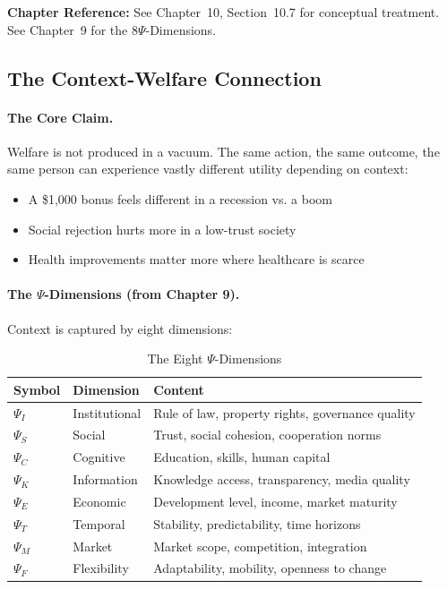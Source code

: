 \begin{cross-reference}
\textbf{Chapter Reference:} See Chapter~10, Section~10.7 for conceptual treatment.
See Chapter~9 for the 8$\Psi$-Dimensions.
\end{cross-reference}

\subsection{The Context-Welfare Connection}

\paragraph{The Core Claim.}
Welfare is not produced in a vacuum. The same action, the same outcome, 
the same person can experience vastly different utility depending on context:

\begin{itemize}
\item A \$1,000 bonus feels different in a recession vs. a boom
\item Social rejection hurts more in a low-trust society
\item Health improvements matter more where healthcare is scarce
\end{itemize}

\paragraph{The $\Psi$-Dimensions (from Chapter 9).}
Context is captured by eight dimensions:

\begin{table}[htbp]
\centering
\caption{The Eight $\Psi$-Dimensions}
\label{tab:app-c-psi-dimensions}
\renewcommand{\arraystretch}{1.3}
\begin{tabular}{@{}lll@{}}
\toprule
\textbf{Symbol} & \textbf{Dimension} & \textbf{Content} \\
\midrule
$\Psi_I$ & Institutional & Rule of law, property rights, governance quality \\
$\Psi_S$ & Social & Trust, social cohesion, cooperation norms \\
$\Psi_C$ & Cognitive & Education, skills, human capital \\
$\Psi_K$ & Information & Knowledge access, transparency, media quality \\
$\Psi_E$ & Economic & Development level, income, market maturity \\
$\Psi_T$ & Temporal & Stability, predictability, time horizons \\
$\Psi_M$ & Market & Market scope, competition, integration \\
$\Psi_F$ & Flexibility & Adaptability, mobility, openness to change \\
\bottomrule
\end{tabular}
\end{table}

